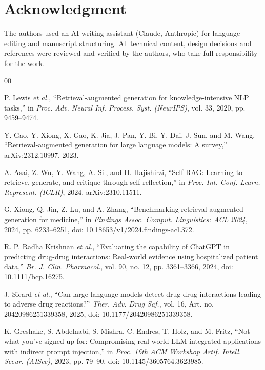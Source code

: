 \documentclass[conference]{IEEEtran}
\begin{document}
\section*{Acknowledgment}

The authors used an AI writing assistant (Claude, Anthropic) for language editing and manuscript structuring. All
technical content, design decisions and references were reviewed and verified by the authors, who take full
responsibility for the work.

\begin{thebibliography}{00}

P. Lewis \emph{et al.}, ``Retrieval-augmented generation for knowledge-intensive NLP tasks,'' in \emph{Proc. Adv. Neural
Inf. Process. Syst. (NeurIPS)}, vol. 33, 2020, pp. 9459--9474.

Y. Gao, Y. Xiong, X. Gao, K. Jia, J. Pan, Y. Bi, Y. Dai, J. Sun, and M. Wang, ``Retrieval-augmented generation for large
language models: A survey,'' arXiv:2312.10997, 2023.

A. Asai, Z. Wu, Y. Wang, A. Sil, and H. Hajishirzi, ``Self-RAG: Learning to retrieve, generate, and critique through
self-reflection,'' in \emph{Proc. Int. Conf. Learn. Represent. (ICLR)}, 2024. arXiv:2310.11511.

G. Xiong, Q. Jin, Z. Lu, and A. Zhang, ``Benchmarking retrieval-augmented generation for medicine,'' in \emph{Findings
Assoc. Comput. Linguistics: ACL 2024}, 2024, pp. 6233--6251, doi: 10.18653/v1/2024.findings-acl.372.

R. P. Radha Krishnan \emph{et al.}, ``Evaluating the capability of ChatGPT in predicting drug-drug interactions:
Real-world evidence using hospitalized patient data,'' \emph{Br. J. Clin. Pharmacol.}, vol. 90, no. 12, pp. 3361--3366,
2024, doi: 10.1111/bcp.16275.

J. Sicard \emph{et al.}, ``Can large language models detect drug-drug interactions leading to adverse drug reactions?''
\emph{Ther. Adv. Drug Saf.}, vol. 16, Art. no. 20420986251339358, 2025, doi: 10.1177/20420986251339358.

K. Greshake, S. Abdelnabi, S. Mishra, C. Endres, T. Holz, and M. Fritz, ``Not what you've signed up for: Compromising
real-world LLM-integrated applications with indirect prompt injection,'' in \emph{Proc. 16th ACM Workshop Artif. Intell.
Secur. (AISec)}, 2023, pp. 79--90, doi: 10.1145/3605764.3623985.


\end{thebibliography}
\end{document}
